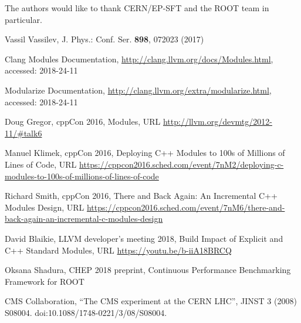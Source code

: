\documentclass{webofc}
\begin{document}
The authors would like to thank CERN/EP-SFT and the ROOT team in particular.

\begin{thebibliography}{plain}

Vassil Vassilev, J. Phys.: Conf. Ser. \textbf{898}, 072023 (2017)

Clang Modules Documentation, \url{http://clang.llvm.org/docs/Modules.html}, accessed: 2018-24-11

Modularize Documentation, \url{http://clang.llvm.org/extra/modularize.html}, accessed: 2018-24-11

Doug Gregor, cppCon 2016, Modules, URL \url{http://llvm.org/devmtg/2012-11/#talk6}

Manuel Klimek, cppCon 2016, Deploying C++ Modules to 100s of Millions of Lines of Code, URL \url{https://cppcon2016.sched.com/event/7nM2/deploying-c-modules-to-100s-of-millions-of-lines-of-code}

Richard Smith, cppCon 2016, There and Back Again: An Incremental C++ Modules Design, URL \url{https://cppcon2016.sched.com/event/7nM6/there-and-back-again-an-incremental-c-modules-design}

David Blaikie, LLVM developer's meeting 2018, Build Impact of Explicit and C++ Standard Modules, URL \url{https://youtu.be/b-iiA18BRCQ}

Oksana Shadura, CHEP 2018 preprint, Continuous Performance Benchmarking Framework for ROOT

CMS Collaboration, “The CMS experiment at the CERN LHC”, JINST 3 (2008) S08004. doi:10.1088/1748-0221/3/08/S08004.

\end{thebibliography}
\end{document}
